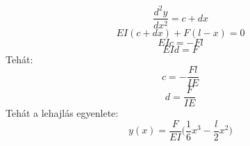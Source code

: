 \documentclass[a4paper]{article}
\begin{document}
\begin{equation}
\frac{d^2y}{dx^2}=c+dx
\end{equation}
\begin{equation}
EI(c+dx)+F(l-x)=0
\end{equation}
\begin{equation}
EIc=-Fl
\end{equation}
\begin{equation}
EId=F
\end{equation}
Tehát:
\begin{equation}
c=-\frac{Fl}{IE}
\end{equation}
\begin{equation}
d=\frac{F}{IE}
\end{equation}
Tehát a lehajlás egyenlete:
\begin{equation}
y(x)=\frac{F}{EI}\Big(\frac{1}{6}x^3-\frac{l}{2}x^2\Big)
\end{equation}
\end{document}
